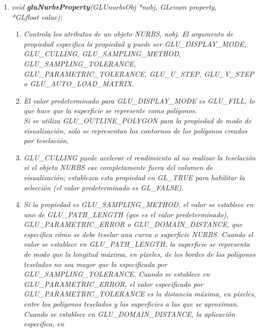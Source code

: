 \begin{enumerate}
    \item[] \emph{void \textbf{gluNurbsProperty}(GLUnurbsObj *nobj, GLenum property,\\*GLfloat value);}
    \begin{enumerate}
        \item[] \textit{
            Controla los atributos de un objeto NURBS, nobj.
            El argumento de propiedad especifica la propiedad y puede
            ser GLU\_DISPLAY\_MODE, GLU\_CULLING, GLU\_SAMPLING\_METHOD,
            GLU\_SAMPLING\_TOLERANCE,\\ GLU\_PARAMETRIC\_TOLERANCE, GLU\_U\_STEP,
            GLU\_V\_STEP\\ o GLU\_AUTO\_LOAD\_MATRIX.
        }
        \item[] \textit{
            El valor predeterminado para GLU\_DISPLAY\_MODE
            es GLU\_FILL, lo que hace que la superficie se represente
            como polígonos.\\Si se utiliza GLU\_OUTLINE\_POLYGON para la
            propiedad de modo de visualización, solo se representan los
            contornos de los polígonos creados por teselación.
        }
        \item[] \textit{
            GLU\_CULLING puede acelerar el rendimiento al
            no realizar la teselación si el objeto NURBS cae completamente
            fuera del volumen de visualización; establezca esta propiedad
            en GL\_TRUE para habilitar la selección (el valor
            predeterminado es GL\_FALSE).
        }
        \item[] \textit{Si la propiedad
            es GLU\_SAMPLING\_METHOD, el valor se establece en uno
            de GLU\_PATH\_LENGTH (que es el valor
            predeterminado), GLU\_PARAMETRIC\_ERROR o
            GLU\_DOMAIN\_DISTANCE, que
            especifica cómo se debe teselar una curva o superficie
            NURBS. Cuando el valor se establece en GLU\_PATH\_LENGTH,
            la superficie se representa de modo que la longitud máxima,
            en píxeles, de los bordes de los polígonos teselados no
            sea mayor que la especificada por GLU\_SAMPLING\_TOLERANCE.
            Cuando se establece en GLU\_PARAMETRIC\_ERROR, el valor
            especificado por \\ GLU\_PARAMETRIC\_TOLERANCE es la distancia
            máxima, en píxeles, entre los polígonos teselados y las
            superficies a las que se aproximan. Cuando se establece
            en GLU\_DOMAIN\_DISTANCE, la aplicación especifica, en
}
\end{enumerate}
\end{enumerate}
